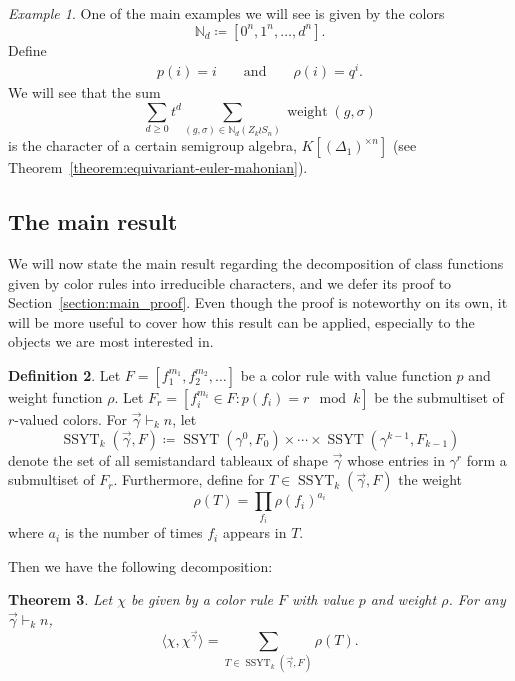 \documentclass[a4paper,12pt]{amsart}
\theoremstyle{plain}
\newtheorem{theorem}{Theorem}[section]
\theoremstyle{definition}
\newtheorem{definition}[theorem]{Definition}
\theoremstyle{remark}
\newtheorem{example}[theorem]{Example}
\DeclareMathOperator{\SSYT}{SSYT}
\DeclareMathOperator{\weight}{weight}
\begin{document}
\begin{example}
    One of the main examples we will see is given by the colors
    \[
    \mathbb{N}_d \coloneq \left[ 0^n, 1^n, \ldots, d^n \right].
    \]
    Define
    \begin{align*}
    p(i) = i && \text{ and } && \rho(i) = q^i.
    \end{align*}
    We will see that the sum
    \[
   \sum_{d \geq 0} t^d \sum_{(g,\sigma) \in \mathbb{N}_d(Z_k \wr S_n) } \weight(g,\sigma)
    \]
    is the character of a certain semigroup algebra, $K[(\Delta_1)^{\times n}]$ (see Theorem~\ref{theorem:equivariant-euler-mahonian}).
\end{example}

\subsection{The main result}

We will now state the main result regarding the decomposition of class functions given by color rules into irreducible characters, and we defer its proof to Section~\ref{section:main_proof}.
Even though the proof is noteworthy on its own, it will be more useful to cover how this result can be applied, especially to the objects we are most interested in.

\begin{definition} \label{definition:SSTYk}
Let $F = [f_1^{m_1},f_2^{m_2},\dots]$ be a color rule with value function $p$ and weight function $\rho$. Let $F_r= [ f_i^{m_i} \in F : p(f_i) = r \mod k]$  be the submultiset of $r$-valued colors. 
For $\vec{\gamma} \vdash_k n$,
let 
\[
\SSYT_k(\vec{\gamma},F)\coloneq \SSYT(\gamma^0,F_0)\times \cdots \times 
\SSYT(\gamma^{k-1},F_{k-1})
\]
denote the set of all semistandard tableaux of shape $\vec{\gamma}$ whose entries in $\gamma^r$ form a submultiset of $F_r$. Furthermore, define for $T\in\SSYT_k(\vec{\gamma},F)$ the weight 
\[
\rho(T) = \prod_{f_i} \rho(f_i)^{a_i}
\]
where $a_i$ is the number of times $f_i$ appears in $T$.
\end{definition}

Then we have the following decomposition:
\begin{theorem} \label{theorem:mainresult} Let $\chi$ be given by a color rule $F$ with value $p$ and weight $\rho$. 
For any $\vec{\gamma} \vdash_k n$,
\[
\langle \chi, \chi^{\vec{\gamma}} \rangle = \sum_{T \in \SSYT_k(\vec{\gamma},F)} \rho(T).
\]
\end{theorem}
\end{document}

